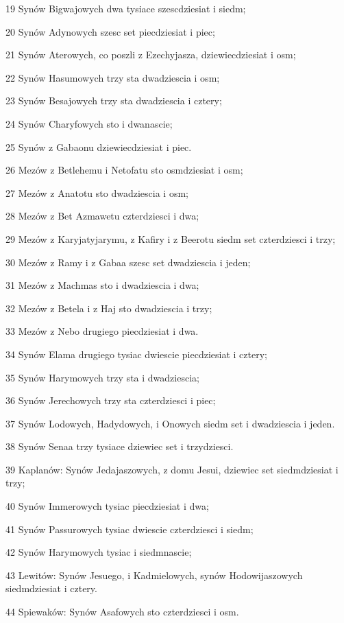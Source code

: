 \par 19 Synów Bigwajowych dwa tysiace szescdziesiat i siedm;
\par 20 Synów Adynowych szesc set piecdziesiat i piec;
\par 21 Synów Aterowych, co poszli z Ezechyjasza, dziewiecdziesiat i osm;
\par 22 Synów Hasumowych trzy sta dwadziescia i osm;
\par 23 Synów Besajowych trzy sta dwadziescia i cztery;
\par 24 Synów Charyfowych sto i dwanascie;
\par 25 Synów z Gabaonu dziewiecdziesiat i piec.
\par 26 Mezów z Betlehemu i Netofatu sto osmdziesiat i osm;
\par 27 Mezów z Anatotu sto dwadziescia i osm;
\par 28 Mezów z Bet Azmawetu czterdziesci i dwa;
\par 29 Mezów z Karyjatyjarymu, z Kafiry i z Beerotu siedm set czterdziesci i trzy;
\par 30 Mezów z Ramy i z Gabaa szesc set dwadziescia i jeden;
\par 31 Mezów z Machmas sto i dwadziescia i dwa;
\par 32 Mezów z Betela i z Haj sto dwadziescia i trzy;
\par 33 Mezów z Nebo drugiego piecdziesiat i dwa.
\par 34 Synów Elama drugiego tysiac dwiescie piecdziesiat i cztery;
\par 35 Synów Harymowych trzy sta i dwadziescia;
\par 36 Synów Jerechowych trzy sta czterdziesci i piec;
\par 37 Synów Lodowych, Hadydowych, i Onowych siedm set i dwadziescia i jeden.
\par 38 Synów Senaa trzy tysiace dziewiec set i trzydziesci.
\par 39 Kaplanów: Synów Jedajaszowych, z domu Jesui, dziewiec set siedmdziesiat i trzy;
\par 40 Synów Immerowych tysiac piecdziesiat i dwa;
\par 41 Synów Passurowych tysiac dwiescie czterdziesci i siedm;
\par 42 Synów Harymowych tysiac i siedmnascie;
\par 43 Lewitów: Synów Jesuego, i Kadmielowych, synów Hodowijaszowych siedmdziesiat i cztery.
\par 44 Spiewaków: Synów Asafowych sto czterdziesci i osm.
